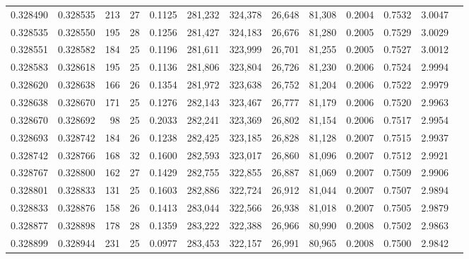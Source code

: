 \begin{tabular}{rrrrrrrrrrrrr}
0.328490 & 0.328535 &   213 &  27 &                                     0.1125 & 281,232 & 324,378 &  26,648 &  81,308 & 0.2004 & 0.7532 & 3.0047 \\
0.328535 & 0.328550 &   195 &  28 &                                     0.1256 & 281,427 & 324,183 &  26,676 &  81,280 & 0.2005 & 0.7529 & 3.0029 \\
0.328551 & 0.328582 &   184 &  25 &                                     0.1196 & 281,611 & 323,999 &  26,701 &  81,255 & 0.2005 & 0.7527 & 3.0012 \\
0.328583 & 0.328618 &   195 &  25 &                                     0.1136 & 281,806 & 323,804 &  26,726 &  81,230 & 0.2006 & 0.7524 & 2.9994 \\
0.328620 & 0.328638 &   166 &  26 &                                     0.1354 & 281,972 & 323,638 &  26,752 &  81,204 & 0.2006 & 0.7522 & 2.9979 \\
0.328638 & 0.328670 &   171 &  25 &                                     0.1276 & 282,143 & 323,467 &  26,777 &  81,179 & 0.2006 & 0.7520 & 2.9963 \\
0.328670 & 0.328692 &    98 &  25 &                                     0.2033 & 282,241 & 323,369 &  26,802 &  81,154 & 0.2006 & 0.7517 & 2.9954 \\
0.328693 & 0.328742 &   184 &  26 &                                     0.1238 & 282,425 & 323,185 &  26,828 &  81,128 & 0.2007 & 0.7515 & 2.9937 \\
0.328742 & 0.328766 &   168 &  32 &                                     0.1600 & 282,593 & 323,017 &  26,860 &  81,096 & 0.2007 & 0.7512 & 2.9921 \\
0.328767 & 0.328800 &   162 &  27 &                                     0.1429 & 282,755 & 322,855 &  26,887 &  81,069 & 0.2007 & 0.7509 & 2.9906 \\
0.328801 & 0.328833 &   131 &  25 &                                     0.1603 & 282,886 & 322,724 &  26,912 &  81,044 & 0.2007 & 0.7507 & 2.9894 \\
0.328833 & 0.328876 &   158 &  26 &                                     0.1413 & 283,044 & 322,566 &  26,938 &  81,018 & 0.2007 & 0.7505 & 2.9879 \\
0.328877 & 0.328898 &   178 &  28 &                                     0.1359 & 283,222 & 322,388 &  26,966 &  80,990 & 0.2008 & 0.7502 & 2.9863 \\
0.328899 & 0.328944 &   231 &  25 &                                     0.0977 & 283,453 & 322,157 &  26,991 &  80,965 & 0.2008 & 0.7500 & 2.9842 \\

\end{tabular}
